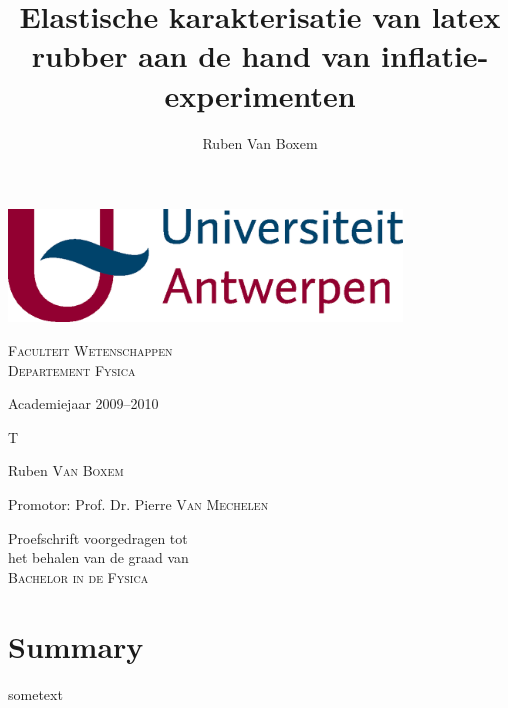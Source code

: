 \documentclass[a4paper,11pt]{article}
\title{Elastische karakterisatie van latex rubber aan de hand van inflatie-experimenten}
\author{Ruben Van Boxem}
\numberwithin{equation}{section} %
\begin{document}
\fontsize{12pt}{14pt}\selectfont

\begin{center}


\includegraphics[height=3cm]{Afbeeldingen/UA.eps}

\vspace{1cm}

\fontsize{14pt}{17pt}\selectfont
\textsc{Faculteit Wetenschappen} \\
\textsc{Departement Fysica}
\fontsize{12pt}{14pt}\selectfont
\vspace{0.3cm}

\vspace{1.2cm}

Academiejaar 2009--2010

\vspace{2.8cm}

\fontsize{17.28pt}{21pt}\selectfont

\textsc{T}

\fontsize{12pt}{14pt}\selectfont

\vspace{3cm}

Ruben \textsc{Van Boxem}	


\vspace{2cm}

Promotor: Prof. Dr. Pierre \textsc{Van Mechelen}\\
\vspace{2cm}
\end{center}
Proefschrift voorgedragen tot \\
het behalen van de graad van\\
\textsc{Bachelor in de Fysica}


\thispagestyle{empty}
\newpage

\section*{Summary}

\newpage
sometext
\end{document}
